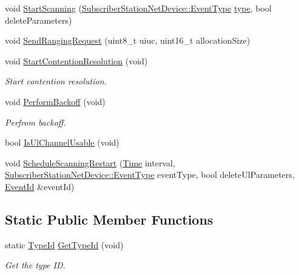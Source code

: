 \begin{DoxyCompactItemize}
\item 
void \hyperlink{classns3_1_1SSLinkManager_af1b551558c882a2ca8bf890093886346}{Start\+Scanning} (\hyperlink{classns3_1_1SubscriberStationNetDevice_ad6dff9205fc72eef67ad77bbe6730fbb}{Subscriber\+Station\+Net\+Device\+::\+Event\+Type} \hyperlink{visualizer-ideas_8txt_add98db9e15e2a58cf2b57623e7aa893a}{type}, bool delete\+Parameters)
\item 
void \hyperlink{classns3_1_1SSLinkManager_a588462b7fadd024760b556fc5e951d2c}{Send\+Ranging\+Request} (uint8\+\_\+t uiuc, uint16\+\_\+t allocation\+Size)
\item 
void \hyperlink{classns3_1_1SSLinkManager_a66aa8588d143de2568b1eebc46df4ad6}{Start\+Contention\+Resolution} (void)
\begin{DoxyCompactList}\small\item\em Start contention resolution. \end{DoxyCompactList}\item 
void \hyperlink{classns3_1_1SSLinkManager_a3ed2a11a1e485c1d836cc6e6fe8a10b2}{Perform\+Backoff} (void)
\begin{DoxyCompactList}\small\item\em Perfrom backoff. \end{DoxyCompactList}\item 
bool \hyperlink{classns3_1_1SSLinkManager_a95ea2618a3e9fffa842a86fe55d0175d}{Is\+Ul\+Channel\+Usable} (void)
\item 
void \hyperlink{classns3_1_1SSLinkManager_a517934e260c83265bd301f5b5b2c33cd}{Schedule\+Scanning\+Restart} (\hyperlink{classns3_1_1Time}{Time} interval, \hyperlink{classns3_1_1SubscriberStationNetDevice_ad6dff9205fc72eef67ad77bbe6730fbb}{Subscriber\+Station\+Net\+Device\+::\+Event\+Type} event\+Type, bool delete\+Ul\+Parameters, \hyperlink{classns3_1_1EventId}{Event\+Id} \&event\+Id)
\end{DoxyCompactItemize}
\subsection*{Static Public Member Functions}
\begin{DoxyCompactItemize}
\item 
static \hyperlink{classns3_1_1TypeId}{Type\+Id} \hyperlink{classns3_1_1SSLinkManager_ad496a256348689adf91aa2ec2f7bb44e}{Get\+Type\+Id} (void)
\begin{DoxyCompactList}\small\item\em Get the type ID. \end{DoxyCompactList}\end{DoxyCompactItemize}
